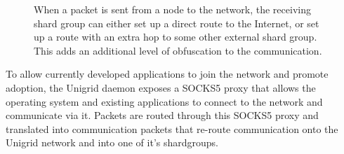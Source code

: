 \documentclass[10pt,a4paper,final]{article}
\begin{document}
\begin{figure}[H]
\centering
	\caption{When a packet is sent from a node to the network, the receiving shard group can either set up a direct route to the Internet, or set up a route with an extra hop to some other external shard group. This adds an additional level of obfuscation to the communication.}
\end{figure}

\noindent To allow currently developed applications to join the network and promote adoption, the Unigrid daemon exposes a SOCKS5 proxy that allows the operating system and existing applications to connect to the network and communicate via it. Packets are routed through this SOCKS5 proxy and translated into communication packets that re-route communication onto the Unigrid network and into one of it's \glspl{shardgroup}.
\end{document}
